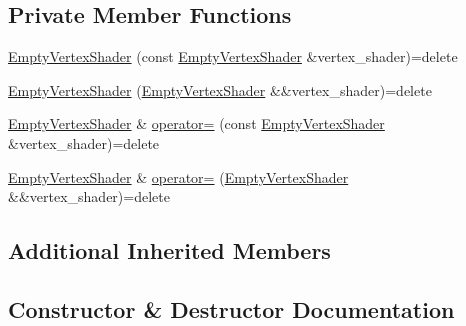 \subsection*{Private Member Functions}
\begin{DoxyCompactItemize}
\item 
\hyperlink{classmage_1_1_empty_vertex_shader_a6ab1b22d108fde8f8876e6a2e4c0decb}{Empty\+Vertex\+Shader} (const \hyperlink{classmage_1_1_empty_vertex_shader}{Empty\+Vertex\+Shader} \&vertex\+\_\+shader)=delete
\item 
\hyperlink{classmage_1_1_empty_vertex_shader_abf41f0b60923651b570abd3d6753f8a0}{Empty\+Vertex\+Shader} (\hyperlink{classmage_1_1_empty_vertex_shader}{Empty\+Vertex\+Shader} \&\&vertex\+\_\+shader)=delete
\item 
\hyperlink{classmage_1_1_empty_vertex_shader}{Empty\+Vertex\+Shader} \& \hyperlink{classmage_1_1_empty_vertex_shader_a2683d29127405d51737008637ebde098}{operator=} (const \hyperlink{classmage_1_1_empty_vertex_shader}{Empty\+Vertex\+Shader} \&vertex\+\_\+shader)=delete
\item 
\hyperlink{classmage_1_1_empty_vertex_shader}{Empty\+Vertex\+Shader} \& \hyperlink{classmage_1_1_empty_vertex_shader_a449401b726fc5cd30012a3d8df2e0832}{operator=} (\hyperlink{classmage_1_1_empty_vertex_shader}{Empty\+Vertex\+Shader} \&\&vertex\+\_\+shader)=delete
\end{DoxyCompactItemize}
\subsection*{Additional Inherited Members}


\subsection{Constructor \& Destructor Documentation}
\hypertarget{classmage_1_1_empty_vertex_shader_a28fae401cf46242513144278dcd7f051}{}\label{classmage_1_1_empty_vertex_shader_a28fae401cf46242513144278dcd7f051} 
